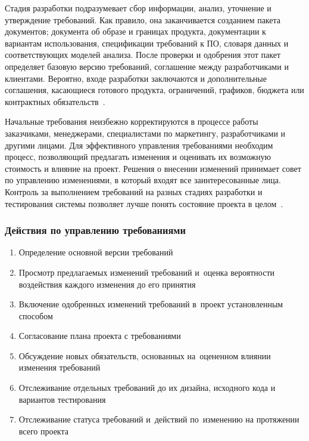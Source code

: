 \documentclass{../industrial-development}
\begin{document}
Стадия разработки подразумевает сбор информации, анализ, уточнение и утверждение требований. Как правило, она заканчивается созданием пакета документов; документа об образе и границах продукта, документации к вариантам использования, спецификации требований к ПО, словаря данных и соответствующих моделей анализа. После проверки и одобрения этот пакет определяет базовую версию требований, соглашение между разработчиками и клиентами. Вероятно, входе разработки заключаются и дополнительные соглашения, касающиеся готового продукта, ограничений, графиков, бюджета или контрактных обязательств~\cite[с.~342]{Wiegers}. 

Начальные требования неизбежно корректируются в процессе работы заказчиками, менеджерами, специалистами по маркетингу, разработчиками и другими лицами. Для эффективного управления требованиями необходим процесс, позволяющий предлагать изменения и оценивать их возможную стоимость и влияние на проект. Решения о внесении изменений принимает совет по управлению изменениями, в который входят все заинтересованные лица. Контроль за выполнением требований на разных стадиях разработки и тестирования системы позволяет лучше понять состояние проекта в целом~\cite[с.~52--53]{Wiegers}.



\begin{frame} \frametitle{Действия по управлению требованиями}
 	 \begin{enumerate}
\item Определение основной версии требований 
\item Просмотр предлагаемых изменений требований и~оценка вероятности воздействия каждого изменения до его принятия
\item Включение одобренных изменений требований в~проект установленным способом
\item Согласование плана проекта с требованиями
\item Обсуждение новых обязательств, основанных на~оцененном влиянии изменения требований
\item Отслеживание отдельных требований до их дизайна, исходного кода и вариантов тестирования
\item Отслеживание статуса требований и~действий по~изменению на протяжении всего проекта
  	\end{enumerate}
\end{frame}
\end{document}
